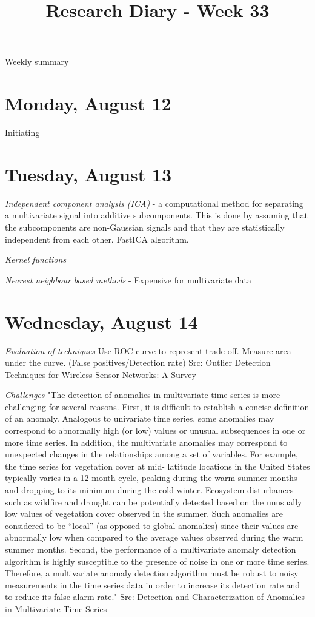 \documentclass[11pt,letterpaper]{article}
\begin{document}
\univlogo

\title{Research Diary - Week 33}

{\Huge Weekly summary}\\[5mm]

\section*{Monday, August 12}
Initiating

\section*{Tuesday, August 13}
\textit{Independent component analysis (ICA)} -  a computational method for separating a multivariate signal into additive subcomponents. This is done by assuming that the subcomponents are non-Gaussian signals and that they are statistically independent from each other. FastICA algorithm.

\textit{Kernel functions}

\textit{Nearest neighbour based methods} - Expensive for multivariate data

\section*{Wednesday, August 14}
\textit{Evaluation of techniques}
Use ROC-curve to represent trade-off. Measure area under the curve. (False positives/Detection rate) 
Src: Outlier Detection Techniques for Wireless Sensor Networks: A Survey

\textit{Challenges}
"The detection of anomalies in multivariate time series
is more challenging for several reasons. First, it is difficult to establish a concise definition of an anomaly. Analogous to univariate time series, some anomalies may correspond to abnormally high (or low) values or unusual subsequences in one or more time series. In addition, the multivariate anomalies may correspond to unexpected changes in the relationships among a set of variables. For example, the time series for vegetation cover at mid- latitude locations in the United States typically varies in a 12-month cycle, peaking during the warm summer months and dropping to its minimum during the cold winter. Ecosystem disturbances such as wildfire and drought can be potentially detected based on the unusually low values of vegetation cover observed in the summer. Such anomalies are considered to be “local” (as opposed to global anomalies) since their values are abnormally low when compared to the average values observed during the warm summer months. Second, the performance of a multivariate anomaly detection algorithm is highly susceptible to the presence of noise in one or more time series. Therefore, a multivariate anomaly detection algorithm must be robust to noisy measurements in the time series data in order to increase its detection rate and to reduce its false alarm rate." 
Src: Detection and Characterization of Anomalies in Multivariate Time Series
\end{document}
